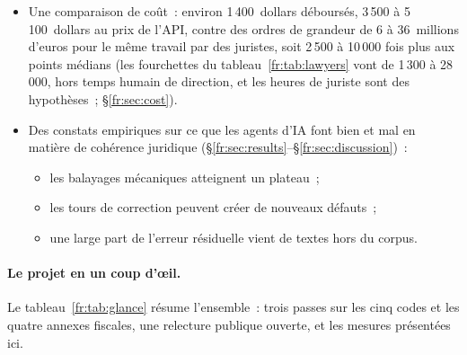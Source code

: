 \documentclass[11pt,a4paper]{article}
\begin{document}
\begin{itemize}
  \item Une comparaison de coût~: environ 1\,400~dollars déboursés, 3\,500 à 5\,100~dollars au prix de l'API, contre des ordres de grandeur de 6 à 36~millions d'euros pour le même travail par des juristes, soit 2\,500 à 10\,000 fois plus aux points médians (les fourchettes du tableau~\ref{fr:tab:lawyers} vont de 1\,300 à 28\,000, hors temps humain de direction, et les heures de juriste sont des hypothèses~; \S\ref{fr:sec:cost}).
  \item Des constats empiriques sur ce que les agents d'IA font bien et mal en matière de cohérence juridique (\S\ref{fr:sec:results}--\S\ref{fr:sec:discussion})~:
  \begin{itemize}
    \item les balayages mécaniques atteignent un plateau~;
    \item les tours de correction peuvent créer de nouveaux défauts~;
    \item une large part de l'erreur résiduelle vient de textes hors du corpus.
  \end{itemize}
\end{itemize}

\paragraph{Le projet en un coup d'\oe{}il.}
Le tableau~\ref{fr:tab:glance} résume l'ensemble~: trois passes sur les cinq codes et les quatre annexes fiscales, une relecture publique ouverte, et les mesures présentées ici.
\end{document}

